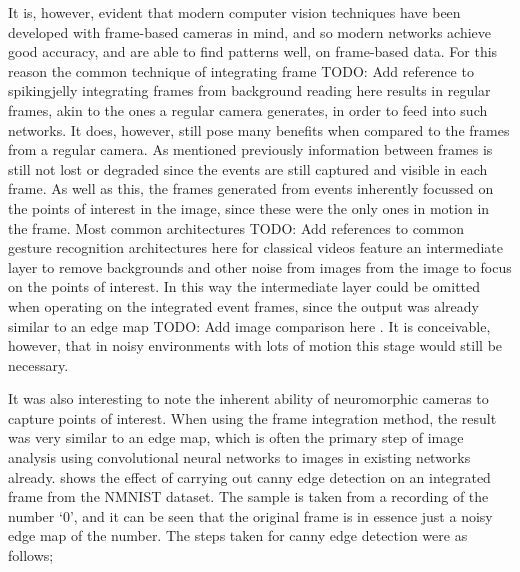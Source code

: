 It is, however, evident that modern computer vision techniques have been developed with frame-based cameras in mind, and so modern networks achieve good accuracy, and are able to find patterns well, on frame-based data. For this reason the common technique of integrating frame \color{red} TODO: Add reference to spikingjelly integrating frames from background reading here \color{black} results in regular frames, akin to the ones a regular camera generates, in order to feed into such networks. It does, however, still pose many benefits when compared to the frames from a regular camera. As mentioned previously information between frames is still not lost or degraded since the events are still captured and visible in each frame. As well as this, the frames generated from events inherently focussed on the points of interest in the image, since these were the only ones in motion in the frame. Most common architectures \color{red} TODO: Add references to common gesture recognition architectures here \color{black} for classical videos feature an intermediate layer to remove backgrounds and other noise from images from the image to focus on the points of interest. In this way the intermediate layer could be omitted when operating on the integrated event frames, since the output was already similar to an edge map \color{red} TODO: Add image comparison here \color{black}. It is conceivable, however, that in noisy environments with lots of motion this stage would still be necessary.

It was also interesting to note the inherent ability of neuromorphic cameras to capture points of interest. When using the frame integration method, the result was very similar to an edge map, which is often the primary step of image analysis using convolutional neural networks to images in existing networks already.  shows the effect of carrying out canny edge detection\cite{CannyEdgeDetection} on an integrated frame from the NMNIST dataset. The sample is taken from a recording of the number `0', and it can be seen that the original frame is in essence just a noisy edge map of the number. The steps taken for canny edge detection were as follows;

